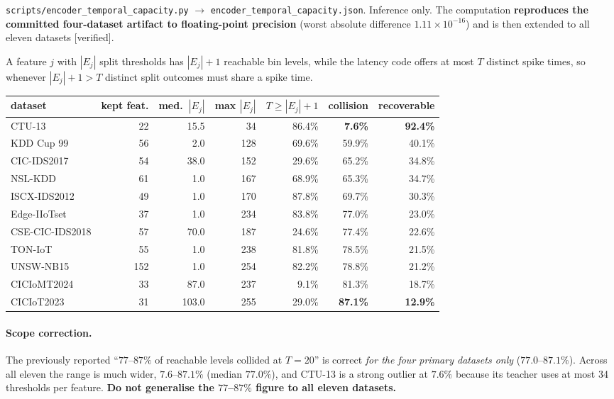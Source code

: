\texttt{scripts/encoder\_temporal\_capacity.py} $\rightarrow$
\texttt{encoder\_temporal\_capacity.json}. Inference only. The computation
\textbf{reproduces the committed four-dataset artifact to floating-point precision}
(worst absolute difference $1.11\times10^{-16}$) and is then extended to all eleven
datasets \textup{[verified]}.

A feature $j$ with $|E_j|$ split thresholds has $|E_j|+1$ reachable bin levels, while the
latency code offers at most $T$ distinct spike times, so whenever $|E_j|+1 > T$ distinct
split outcomes must share a spike time.

\begin{center}\scriptsize
\begin{tabular}{lrrrrrr}\toprule
dataset & kept feat. & med.\ $|E_j|$ & max $|E_j|$ & $T\!\geq\!|E_j|{+}1$ & collision &
recoverable \\\midrule
CTU-13          &  22 &  15.5 &  34 & 86.4\% & \textbf{7.6\%}  & \textbf{92.4\%} \\
KDD Cup 99      &  56 &   2.0 & 128 & 69.6\% & 59.9\% & 40.1\% \\
CIC-IDS2017     &  54 &  38.0 & 152 & 29.6\% & 65.2\% & 34.8\% \\
NSL-KDD         &  61 &   1.0 & 167 & 68.9\% & 65.3\% & 34.7\% \\
ISCX-IDS2012    &  49 &   1.0 & 170 & 87.8\% & 69.7\% & 30.3\% \\
Edge-IIoTset    &  37 &   1.0 & 234 & 83.8\% & 77.0\% & 23.0\% \\
CSE-CIC-IDS2018 &  57 &  70.0 & 187 & 24.6\% & 77.4\% & 22.6\% \\
TON-IoT         &  55 &   1.0 & 238 & 81.8\% & 78.5\% & 21.5\% \\
UNSW-NB15       & 152 &   1.0 & 254 & 82.2\% & 78.8\% & 21.2\% \\
CICIoMT2024     &  33 &  87.0 & 237 &  9.1\% & 81.3\% & 18.7\% \\
CICIoT2023      &  31 & 103.0 & 255 & 29.0\% & \textbf{87.1\%} & \textbf{12.9\%} \\
\bottomrule\end{tabular}\end{center}

\paragraph{$\!$Scope correction.} The previously reported ``$77$--$87\%$ of reachable
levels collided at $T=20$'' is correct \emph{for the four primary datasets only}
($77.0$--$87.1\%$). Across all eleven the range is much wider,
$\mathbf{7.6}$--$\mathbf{87.1\%}$ (median $77.0\%$), and CTU-13 is a strong outlier at
$7.6\%$ because its teacher uses at most 34 thresholds per feature. \textbf{Do not
generalise the $77$--$87\%$ figure to all eleven datasets.}

